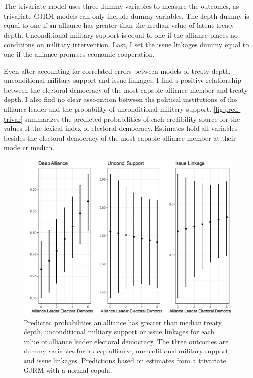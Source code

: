 \documentclass[12pt]{article}
\begin{document}
The trivariate model uses three dummy variables to measure the outcomes, as trivariate GJRM models can only include dummy variables. 
The depth dummy is equal to one if an alliance has greater than the median value of latent treaty depth. 
Unconditional military support is equal to one if the alliance places no conditions on military intervention. 
Last, I set the issue linkages dummy equal to one if the alliance promises economic cooperation. 


Even after accounting for correlated errors between models of treaty depth, unconditional military support and issue linkages, I find a positive relationship between the electoral democracy of the most capable alliance member and treaty depth. 
I also find no clear association between the political institutions of the alliance leader and the probability of unconditional military support. 
\autoref{fig:pred-trivar} summarizes the predicted probabilities of each credibility source for the values of the lexical index of electoral democracy. 
Estimates hold all variables besides the electoral democracy of the most capable alliance member at their mode or median.  


\begin{figure}
\includegraphics[width=.95\textwidth]{pred-trivar.png}  
\caption{Predicted probabilities an alliance has greater than median treaty depth, unconditional military support or issue linkages for each value of alliance leader electoral democracy. The three outcomes are dummy variables for a deep alliance, unconditional military support, and issue linkages. Predictions based on estimates from a trivariate GJRM with a normal copula.}
\label{fig:pred-trivar}
\end{figure}




\newpage

\singlespace
 
 
\end{document}
